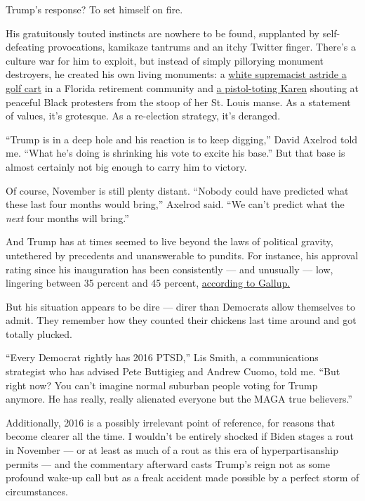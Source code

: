 Trump's response? To set himself on fire.

His gratuitously touted instincts are nowhere to be found, supplanted by
self-defeating provocations, kamikaze tantrums and an itchy Twitter
finger. There's a culture war for him to exploit, but instead of simply
pillorying monument destroyers, he created his own living monuments: a
\href{https://www.nytimes3xbfgragh.onion/2020/06/28/us/politics/trump-white-power-video-racism.html}{white
supremacist astride a golf cart} in a Florida retirement community and
\href{https://www.nytimes3xbfgragh.onion/2020/06/29/us/politics/trump-white-couple-protesters.html}{a
pistol-toting Karen} shouting at peaceful Black protesters from the
stoop of her St. Louis manse. As a statement of values, it's grotesque.
As a re-election strategy, it's deranged.

``Trump is in a deep hole and his reaction is to keep digging,'' David
Axelrod told me. ``What he's doing is shrinking his vote to excite his
base.'' But that base is almost certainly not big enough to carry him to
victory.

Of course, November is still plenty distant. ``Nobody could have
predicted what these last four months would bring,'' Axelrod said. ``We
can't predict what the \emph{next} four months will bring.''

And Trump has at times seemed to live beyond the laws of political
gravity, untethered by precedents and unanswerable to pundits. For
instance, his approval rating since his inauguration has been
consistently --- and unusually --- low, lingering between 35 percent and
45 percent,
\href{https://news.gallup.com/poll/203207/trump-job-approval-weekly.aspx}{according
to Gallup.}

But his situation appears to be dire --- direr than Democrats allow
themselves to admit. They remember how they counted their chickens last
time around and got totally plucked.

``Every Democrat rightly has 2016 PTSD,'' Lis Smith, a communications
strategist who has advised Pete Buttigieg and Andrew Cuomo, told me.
``But right now? You can't imagine normal suburban people voting for
Trump anymore. He has really, really alienated everyone but the MAGA
true believers.''

Additionally, 2016 is a possibly irrelevant point of reference, for
reasons that become clearer all the time. I wouldn't be entirely shocked
if Biden stages a rout in November --- or at least as much of a rout as
this era of hyperpartisanship permits --- and the commentary afterward
casts Trump's reign not as some profound wake-up call but as a freak
accident made possible by a perfect storm of circumstances.


